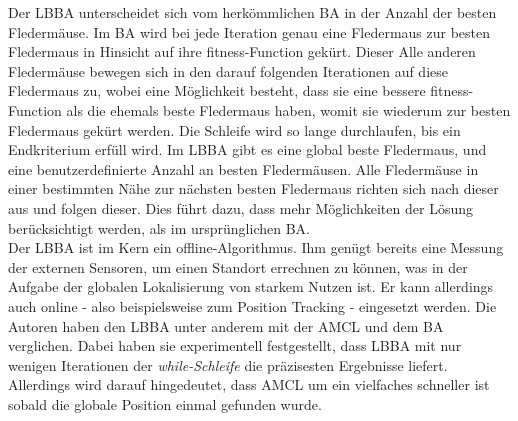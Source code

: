 Der LBBA unterscheidet sich vom herkömmlichen BA in der Anzahl der besten Fledermäuse. Im BA wird bei jede Iteration genau eine Fledermaus zur besten Fledermaus in Hinsicht auf ihre fitness-Function gekürt. Dieser Alle anderen Fledermäuse bewegen sich in den darauf folgenden Iterationen auf diese Fledermaus zu, wobei eine Möglichkeit besteht, dass sie eine bessere fitness-Function als die ehemals beste Fledermaus haben, womit sie wiederum zur besten Fledermaus gekürt werden. Die Schleife wird so lange durchlaufen, bis ein Endkriterium erfüll wird. Im LBBA gibt es eine global beste Fledermaus, und eine benutzerdefinierte Anzahl an besten Fledermäusen. Alle Fledermäuse in einer bestimmten Nähe zur nächsten besten Fledermaus richten sich nach dieser aus und folgen dieser. Dies führt dazu, dass mehr Möglichkeiten der Lösung berücksichtigt werden, als im ursprünglichen BA.\\
Der LBBA ist im Kern ein offline-Algorithmus. Ihm genügt bereits eine Messung der externen Sensoren, um einen Standort errechnen zu können, was in der Aufgabe der globalen Lokalisierung von starkem Nutzen ist. Er kann allerdings auch online - also beispielsweise zum Position Tracking - eingesetzt werden. Die Autoren haben den LBBA unter anderem mit der AMCL und dem BA verglichen. Dabei haben sie experimentell festgestellt, dass LBBA mit nur wenigen Iterationen der \textit{while-Schleife} die präzisesten Ergebnisse liefert. Allerdings wird darauf hingedeutet, dass AMCL um ein vielfaches schneller ist sobald die globale Position einmal gefunden wurde.


